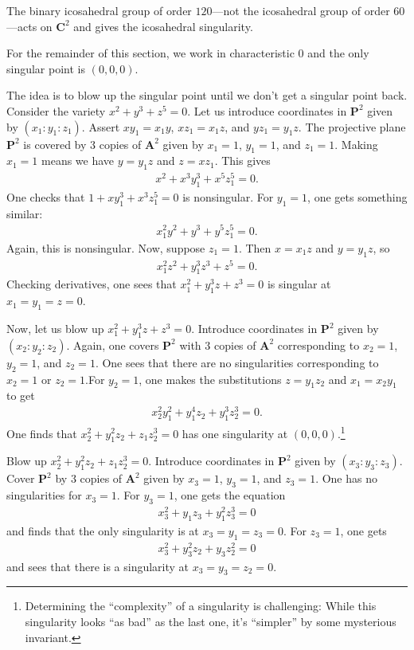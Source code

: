 \documentclass [11 pt, oneside] {article}
\begin{document}
The binary icosahedral group of order $120$---not the icosahedral group of order $60$---acts on $\mathbf{C}^2$ and gives the icosahedral singularity. 
\begin{remark}
	For the remainder of this section, we work in characteristic $0$ and the only singular point is $(0,0,0)$.
\end{remark}
\begin{example}\label{}\text{}
The idea is to blow up the singular point until we don't get a singular point back. Consider the variety $x^2+y^3+z^5=0$. Let us introduce coordinates in $\mathbf{P}^2$ given by $(x_1:y_1:z_1)$. Assert $xy_1=x_1y$, $xz_1=x_1z$, and $yz_1=y_1z$. The projective plane $\mathbf{P}^2$ is covered by $3$ copies of $\mathbf{A}^2$ given by $x_1=1$, $y_1=1$, and $z_1=1$. Making $x_1=1$ means we have $y=y_1z$ and $z=xz_1$. This gives 
\begin{align*}
	x^2+x^3y_1^3+x^5z_1^5=0.
\end{align*}
One checks that $1+xy_1^3 + x^3z_1^5=0$ is nonsingular. For $y_1=1$, one gets something similar:
\begin{align*}
	x_1^2y^2 + y^3 +y^5z_1^5=0.
\end{align*}
Again, this is nonsingular. Now, suppose $z_1=1$. Then $x=x_1z$ and $y=y_1z$, so
\begin{align*}
	x_1^2z^2 + y_1^3z^3 + z^5 =0.
\end{align*}
Checking derivatives, one sees that $x_1^2 + y_1^3z+z^3=0$ is singular at $x_1=y_1=z=0$.

Now, let us blow up $x_1^2+y_1^3z+z^3=0$. Introduce coordinates in $\mathbf{P}^2$ given by $(x_2:y_2:z_2)$. Again, one covers $\mathbf{P}^2$ with $3$ copies of $\mathbf{A}^2$ corresponding to $x_2=1$, $y_2=1$, and $z_2=1$. One sees that there are no singularities corresponding to $x_2=1$ or $z_2=1$.For $y_2=1$, one makes the substitutions $z=y_1z_2$ and $x_1=x_2y_1$ to get
\begin{align*}
	x_2^2y_1^2 + y_1^4z_2+y_1^3z_2^3=0.
\end{align*}
One finds that $x_2^2+y_1^2z_2+z_1z_2^3=0$ has one singularity at $(0,0,0)$.\footnote{Determining the ``complexity'' of a singularity is challenging: While this singularity looks ``as bad'' as the last one, it's ``simpler'' by some mysterious invariant.}

Blow up $x_2^2+y_1^2z_2+z_1z_2^3=0$. Introduce coordinates in $\mathbf{P}^2$ given by $(x_3:y_3:z_3)$. Cover $\mathbf{P}^2$ by $3$ copies of $\mathbf{A}^2$ given by $x_3=1$, $y_3=1$, and $z_3=1$. One has no singularities for $x_3=1$. For $y_3=1$, one gets the equation 
\begin{align*}
	x_3^2+y_1z_3+y_1^2z_3^3 =0
\end{align*}
and finds that the only singularity is at $x_3=y_1=z_3=0$. For $z_3=1$, one gets
\begin{align*}
	x_3^2+y_3^2z_2+y_3z_2^2 =0
\end{align*}
and sees that there is a singularity at $x_3=y_3=z_2=0$.


\end{example}
\end{document}
